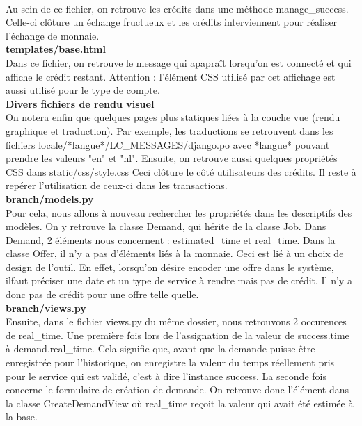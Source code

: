 \\%
Au sein de ce fichier,   on retrouve les crédits dans une méthode manage\_success.  Celle-ci clôture un échange fructueux et les crédits interviennent pour réaliser l'échange de monnaie.  
\\
\textbf{templates/base.html}
\\%
Dans ce fichier,  on retrouve le message qui apapraît lorsqu'on est connecté et qui affiche le crédit restant.  Attention : l'élément CSS utilisé par cet affichage est aussi utilisé pour le type de compte.   
\\
\textbf{Divers fichiers de rendu visuel}
\\%
On notera enfin que quelques pages plus statiques liées à la couche vue (rendu graphique et traduction).  Par exemple,  les traductions se retrouvent dans les fichiers locale/*langue*/LC\_MESSAGES/django.po avec *langue* pouvant prendre les valeurs "en" et "nl".  Ensuite,  on retrouve aussi quelques propriétés CSS dans static/css/style.css 
\newline
Ceci clôture le côté utilisateurs des crédits.  Il reste à repérer l'utilisation de ceux-ci dans les transactions.  
\\
\textbf{branch/models.py}
\\%
Pour cela,  nous allons à nouveau rechercher les propriétés dans les descriptifs des modèles. 
On y retrouve la classe Demand,  qui hérite de la classe Job.  Dans Demand,  2 éléments nous concernent : estimated\_time et real\_time.  
Dans la classe Offer,  il n'y a pas d'éléments liés à la monnaie.  Ceci est lié à un choix de design de l'outil.  En effet,   lorsqu'on désire encoder une offre dans le système,  ilfaut préciser une date et un type de service à rendre mais pas de crédit.  Il n'y a donc pas de crédit pour une offre telle quelle.
\\
\textbf{branch/views.py}
\\%
Ensuite,  dans le fichier views.py du même dossier,   nous retrouvons 2 occurences de real\_time.  
Une première fois lors de l'assignation de la valeur de success.time à demand.real\_time.  Cela signifie que,  avant que la demande puisse être enregistrée pour l'historique,  on enregistre la valeur du temps réellement pris pour le service qui est validé,  c'est à dire l'instance success.
La seconde fois concerne le formulaire de création de demande.  On retrouve donc l'élément dans la classe CreateDemandView où real\_time reçoit la valeur qui avait été estimée à la base.  
